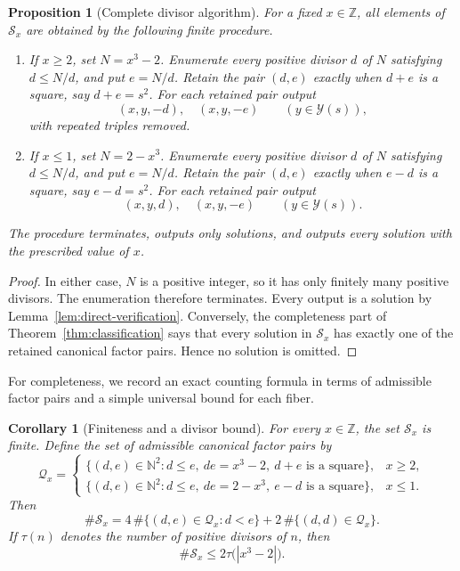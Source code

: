 \documentclass[11pt,a4paper]{article}
\newtheorem{proposition}[theorem]{Proposition}
\newtheorem{corollary}[theorem]{Corollary}
\theoremstyle{definition}
\theoremstyle{remark}
\newcommand{\Z}{\mathbb Z}
\newcommand{\N}{\mathbb N}
\newcommand{\Sols}{\mathscr S}
\newcommand{\Yset}{\mathcal Y}
\begin{document}
\begin{proposition}[Complete divisor algorithm]\label{prop:algorithm}
For a fixed $x\in\Z$, all elements of $\Sols_x$ are obtained by the following
finite procedure.

\begin{enumerate}[leftmargin=2.2em]
\item If $x\geq2$, set $N=x^3-2$.  Enumerate every positive divisor $d$ of
$N$ satisfying $d\leq N/d$, and put $e=N/d$.  Retain the pair $(d,e)$ exactly
when $d+e$ is a square, say $d+e=s^2$.  For each retained pair output
\[
 (x,y,-d),\quad (x,y,-e)
 \qquad (y\in\Yset(s)),
\]
with repeated triples removed.

\item If $x\leq1$, set $N=2-x^3$.  Enumerate every positive divisor $d$ of
$N$ satisfying $d\leq N/d$, and put $e=N/d$.  Retain the pair $(d,e)$ exactly
when $e-d$ is a square, say $e-d=s^2$.  For each retained pair output
\[
 (x,y,d),\quad (x,y,-e)
 \qquad (y\in\Yset(s)).
\]
\end{enumerate}
The procedure terminates, outputs only solutions, and outputs every solution
with the prescribed value of $x$.
\end{proposition}

\begin{proof}
In either case, $N$ is a positive integer, so it has only finitely many
positive divisors.  The enumeration therefore terminates.  Every output is a
solution by Lemma~\ref{lem:direct-verification}.  Conversely, the completeness
part of Theorem~\ref{thm:classification} says that every solution in
$\Sols_x$ has exactly one of the retained canonical factor pairs.  Hence no
solution is omitted.
\end{proof}

For completeness, we record an exact counting formula in terms of admissible
factor pairs and a simple universal bound for each fiber.

\begin{corollary}[Finiteness and a divisor bound]\label{cor:counting}
For every $x\in\Z$, the set $\Sols_x$ is finite.  Define the set of admissible
canonical factor pairs by
\[
 \mathcal Q_x=
 \begin{cases}
 \{(d,e)\in\N^2:d\leq e,\ de=x^3-2,\ d+e\text{ is a square}\},
   &x\geq2,\\[1mm]
 \{(d,e)\in\N^2:d\leq e,\ de=2-x^3,\ e-d\text{ is a square}\},
   &x\leq1.
 \end{cases}
\]
Then
\begin{equation}
 \#\Sols_x
 =4\,\#\{(d,e)\in\mathcal Q_x:d<e\}
  +2\,\#\{(d,d)\in\mathcal Q_x\}.
 \label{eq:exact-count}
\end{equation}
If $\tau(n)$ denotes the number of positive divisors of $n$, then
\begin{equation}
 \#\Sols_x\leq 2\tau\bigl(|x^3-2|\bigr).
 \label{eq:divisor-bound}
\end{equation}
\end{corollary}
\end{document}
